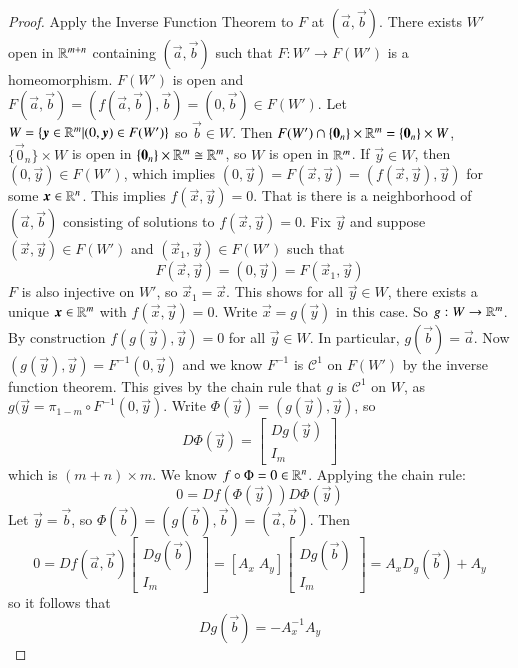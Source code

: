 \begin{proof}
    Apply the Inverse Function Theorem to $F$ at $(\vec{a},\vec{b})$. There exists $W'$ open in $\mathbb R^{m+n}$ containing $(\vec{a},\vec{b})$ such that $F:W'\rightarrow F(W')$ is a homeomorphism. $F(W')$ is open and $F(\vec{a},\vec{b}) = (f(\vec{a},\vec{b}),\vec{b}) = (0,\vec{b}) \in F(W')$. Let $W = \{\vec{y} \in \R^m\vert (0,\vec{y})\in F(W')\}$ so $\vec{b} \in W$. Then $F(W')\cap \{\vec{0}_n\}\times \R^m = \{\vec{0}_n\}\times W$, $\{\vec{0}_n\}\times W$ is open in $\{\vec{0}_n\}\times \R^m \cong \R^m$, so $W$ is open in $\mathbb R^m$. If $\vec{y} \in W$, then $(0,\vec{y}) \in F(W')$, which implies $(0,\vec{y}) = F(\vec{x},\vec{y}) = (f(\vec{x},\vec{y}),\vec{y})$ for some $\vec{x} \in \R^n$. This implies $f(\vec{x},\vec{y}) = 0$. That is there is a neighborhood of $(\vec{a},\vec{b})$ consisting of solutions to $f(\vec{x},\vec{y}) = 0$. Fix $\vec{y}$ and suppose $(\vec{x},\vec{y}) \in F(W')$ and $(\vec{x}_1,\vec{y}) \in F(W')$ such that $$F(\vec{x},\vec{y}) = (0,\vec{y}) = F(\vec{x}_1,\vec{y})$$ $F$ is also injective on $W'$, so $\vec{x}_1 = \vec{x}$. This shows for all $\vec{y} \in W$, there exists a unique $\vec{x} \in \R^m$ with $f(\vec{x},\vec{y}) = 0$. Write $\vec{x} = g(\vec{y})$ in this case. So $g:W\rightarrow \mathbb R^m$. By construction $f(g(\vec{y}),\vec{y}) = 0$ for all $\vec{y} \in W$. In particular, $g(\vec{b})=\vec{a}$. Now $(g(\vec{y}),\vec{y}) = F^{-1}(0,\vec{y})$ and we know $F^{-1}$ is $\mathcal{C}^1$ on $F(W')$ by the inverse function theorem. This gives by the chain rule that $g$ is $\mathcal{C}^1$ on $W$, as $g(\vec{y} = \pi_{1-m}\circ F^{-1}(0,\vec{y})$. Write $\Phi(\vec{y}) = (g(\vec{y}),\vec{y})$, so $$D\Phi(\vec{y}) = \begin{bmatrix} Dg(\vec{y}) \\ I_m\end{bmatrix}$$ which is $(m+n)\times m$. We know $f\circ \Phi = 0 \in \mathbb R^n$. Applying the chain rule: $$0 = Df(\Phi(\vec{y}))D\Phi(\vec{y})$$ Let $\vec{y} = \vec{b}$, so $\Phi(\vec{b}) = (g(\vec{b}),\vec{b}) = (\vec{a},\vec{b})$. Then $$0 = Df(\vec{a},\vec{b})\begin{bmatrix} Dg(\vec{b}) \\ I_m \end{bmatrix} = [A_x\;A_y]\begin{bmatrix} Dg(\vec{b}) \\ I_m\end{bmatrix} = A_xD_g(\vec{b})+A_y$$ so it follows that $$Dg(\vec{b}) = -A_x^{-1}A_y$$
\end{proof}




